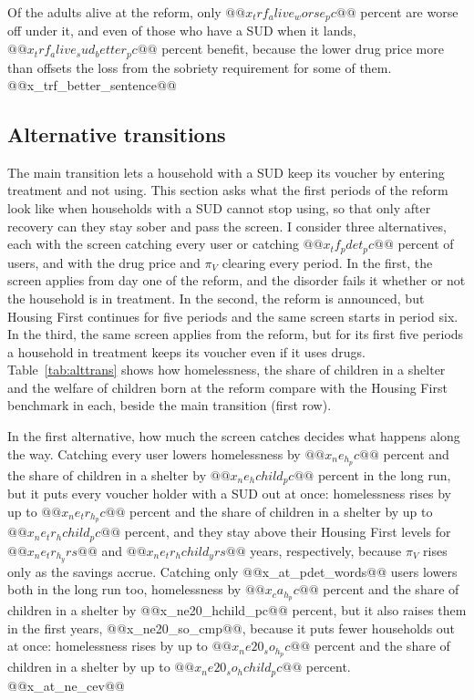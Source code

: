 \documentclass[10pt]{article}
\begin{document}
Of the adults alive at the reform, only $@@x_trf_alive_worse_pc@@$ percent are worse off under it, and even of those who have a SUD when it lands, $@@x_trf_alive_sud_better_pc@@$ percent benefit, because the lower drug
price more than offsets the loss from the sobriety requirement for some of them. @@x_trf_better_sentence@@

\subsection{Alternative transitions}\label{sec:alttrans}

The main transition lets a household with a SUD keep its voucher by entering treatment and not using. This section asks what the first periods of the reform look like when households with a SUD cannot stop using, so that only after recovery can they stay sober and pass the screen. I consider three alternatives, each with the screen catching every user or catching $@@x_tf_pdet_pc@@$ percent of users, and with the drug price and $\pi_V$ clearing every period. In the first, the screen applies from day one of the reform, and the disorder fails it whether or not the household is in treatment. In the second, the reform is announced, but Housing First continues for five periods and the same screen starts in period six. In the third, the same screen applies from the reform, but for its first five periods a household in treatment keeps its voucher even if it uses drugs. Table~\ref{tab:alttrans} shows how homelessness, the share of children in a shelter and the welfare of children born at the reform compare with the Housing First benchmark in each, beside the main transition (first row).




In the first alternative, how much the screen catches decides what happens along the way. Catching every user lowers homelessness by $@@x_ne_h_pc@@$ percent and the share of children in a shelter by $@@x_ne_hchild_pc@@$ percent in the long run, but it puts every voucher holder with a SUD out at once: homelessness rises by up to $@@x_ne_tr_h_pc@@$ percent and the share of children in a shelter by up to $@@x_ne_tr_hchild_pc@@$ percent, and they stay above their Housing First levels for $@@x_ne_tr_h_yrs@@$ and $@@x_ne_tr_hchild_yrs@@$ years, respectively, because $\pi_V$ rises only as the savings accrue. Catching only @@x_at_pdet_words@@ users lowers both in the long run too, homelessness by $@@x_ca_h_pc@@$ percent and the share of children in a shelter by @@x_ne20_hchild_pc@@ percent, but it also raises them in the first years, @@x_ne20_so_cmp@@, because it puts fewer households out at once:  homelessness rises by up to $@@x_ne20_so_h_pc@@$ percent and the share of children in a shelter by up to $@@x_ne20_so_hchild_pc@@$ percent. @@x_at_ne_cev@@
\end{document}
